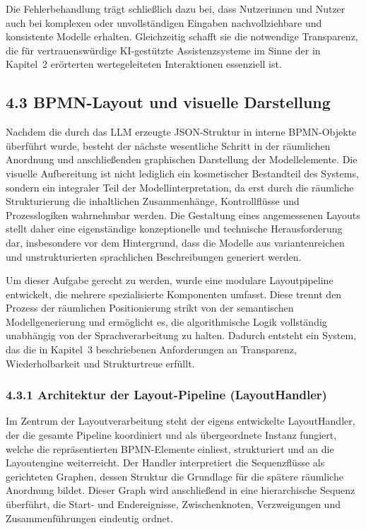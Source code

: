 \documentclass[a4paper,12pt]{scrreprt}
\begin{document}
Die Fehlerbehandlung trägt schließlich dazu bei, dass Nutzerinnen und Nutzer auch bei komplexen oder unvollständigen Eingaben nachvollziehbare und konsistente Modelle erhalten. Gleichzeitig schafft sie die notwendige Transparenz, die für vertrauenswürdige KI-gestützte Assistenzsysteme im Sinne der in Kapitel~2 erörterten wertegeleiteten Interaktionen essenziell ist.

\subsection*{4.3 BPMN-Layout und visuelle Darstellung}

Nachdem die durch das LLM erzeugte JSON-Struktur in interne BPMN-Objekte überführt wurde, besteht der nächste wesentliche Schritt in der räumlichen Anordnung und anschließenden graphischen Darstellung der Modellelemente. Die visuelle Aufbereitung ist nicht lediglich ein kosmetischer Bestandteil des Systems, sondern ein integraler Teil der Modellinterpretation, da erst durch die räumliche Strukturierung die inhaltlichen Zusammenhänge, Kontrollflüsse 
und Prozesslogiken wahrnehmbar werden. Die Gestaltung eines angemessenen Layouts stellt daher eine eigenständige konzeptionelle und technische Herausforderung dar, insbesondere vor dem Hintergrund, dass die Modelle aus variantenreichen und unstrukturierten sprachlichen Beschreibungen generiert werden.

Um dieser Aufgabe gerecht zu werden, wurde eine modulare Layoutpipeline entwickelt, die mehrere spezialisierte Komponenten umfasst. Diese trennt den Prozess der räumlichen Positionierung strikt von der semantischen Modellgenerierung und ermöglicht es, die algorithmische Logik vollständig unabhängig von der Sprachverarbeitung zu halten. Dadurch entsteht ein System, das die in Kapitel~3 beschriebenen Anforderungen an Transparenz, Wiederholbarkeit und Strukturtreue erfüllt.

\subsubsection*{4.3.1 Architektur der Layout-Pipeline (LayoutHandler)}

Im Zentrum der Layoutverarbeitung steht der eigens entwickelte LayoutHandler, der die gesamte Pipeline koordiniert und als übergeordnete Instanz fungiert, welche die repräsentierten BPMN-Elemente einliest, strukturiert und an die Layoutengine weiterreicht. Der Handler interpretiert die Sequenzflüsse als gerichteten Graphen, dessen Struktur die Grundlage für die spätere räumliche Anordnung bildet. Dieser Graph wird anschließend in eine hierarchische Sequenz überführt, die Start- und Endereignisse, Zwischenknoten, Verzweigungen und Zusammenführungen eindeutig ordnet. 
\end{document}
